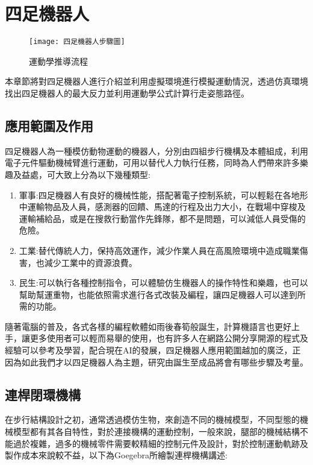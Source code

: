 
\chapter{四足機器人}
\begin{figure}[hbt!]
\begin{center}
\label{四足機器人步驟圖}
\texttt{[image: 四足機器人步驟圖]}
\caption{\Large 運動學推導流程}
\end{center}
\end{figure}
本章節將對四足機器人進行介紹並利用虛擬環境進行模擬運動情況，透過仿真環境找出四足機器人的最大反力並利用運動學公式計算行走姿態路徑。\\

\section{應用範圍及作用}


四足機器人為一種模仿動物運動的機器人，分別由四組步行機構及本體組成，利用電子元件驅動機械臂進行運動，可用以替代人力執行任務，同時為人們帶來許多樂趣及益處，可大致上分為以下幾種類型:\\

\begin{enumerate}
\item 軍事:四足機器人有良好的機械性能，搭配著電子控制系統，可以輕鬆在各地形中運輸物品及人員，感測器的回饋、馬達的行程及出力大小，在戰場中穿梭及運輸補給品，或是在搜救行動當作先鋒隊，都不是問題，可以減低人員受傷的危險。\
\item 工業:替代傳統人力，保持高效運作，減少作業人員在高風險環境中造成職業傷害，也減少工業中的資源浪費。\
\item 民生:可以執行各種控制指令，可以體驗仿生機器人的操作特性和樂趣，也可以幫助幫運重物，也能依照需求進行各式改裝及編程，讓四足機器人可以達到所需的功能。\
\end{enumerate}
\newpage

隨著電腦的普及，各式各樣的編程軟體如雨後春筍般誕生，計算機語言也更好上手，讓更多使用者可以輕而易舉的使用，也有許多人在網路公開分享開源的程式及經驗可以參考及學習，配合現在AI的發展，四足機器人應用範圍越加的廣泛，正因為如此我們才以四足機器人為主題，研究由誕生至成品將會有哪些步驟及考量。\\

\section{連桿閉環機構}
在步行結構設計之初，通常透過模仿生物，來創造不同的機械模型，不同型態的機械模型都有其各自特性，對於連接機構的運動控制，一般來說，腿部的機械結構不能過於複雜，過多的機械零件需要較精細的控制元件及設計，對於控制運動軌跡及製作成本來說較不益，以下為Goegebra所繪製連桿機構講述:\\

